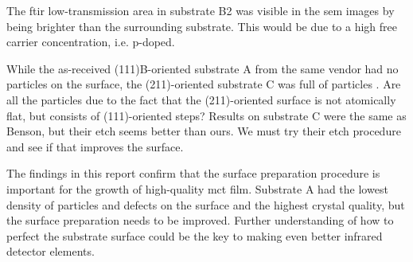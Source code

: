 The \ac{ftir} low-transmission area in substrate B2 was visible in the \ac{sem} images by being brighter than the surrounding substrate. This would be due to a high free carrier concentration, i.e. p-doped.

While the as-received (111)B-oriented substrate A from the same vendor had no particles on the surface, the (211)-oriented substrate C was full of particles . Are all the particles due to the fact that the (211)-oriented surface is not atomically flat, but consists of (111)-oriented steps?  Results on substrate C were the same as Benson, but their etch seems better than ours. We must try their etch procedure and see if that improves the surface.

The findings in this report confirm that the surface preparation procedure is important for the growth of high-quality \ac{mct} film. Substrate A had the lowest density of particles and defects on the surface and the highest crystal quality, but the surface preparation needs to be improved. Further understanding of how to perfect the substrate surface could be the key to making even better infrared detector elements.











